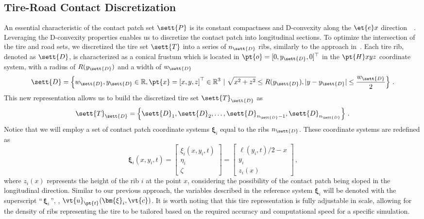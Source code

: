 \subsection{Tire-Road Contact Discretization}

An essential characteristic of the contact patch set $\sett{P}$ is its constant compactness and D-convexity along the $\et{e}x$ direction~~\cite{romano2022analytical, matouvsek2001directional}. Leveraging the D-convexity properties enables us to discretize the contact patch into longitudinal sections. To optimize the intersection of the tire and road sets, we discretized the tire set $\sett{T}$ into a series of $n_\sett{D}$ ribs, similarly to the approach in~\cite{chollet2012model, stocco2024novel}. Each tire rib, denoted as $\sett{D}$, is characterized as a conical frustum which is located in $\pt{o}= [0,y_\sett{D},0]^\top$ in the $\pt{H}xyz$ coordinate system, with a radius of $R(y_\sett{D})$ and a width of $w_\sett{D}$
%
\begin{equation}
  \sett{D} = \left\{ w_\sett{D}, y_\sett{D} \in \mathbb{R}, \pt{x} = \left[ x, y, z \right]^\top \in \mathbb{R}^3 ~|~ \sqrt{x^2+z^2} \leq R(y_\sett{D}), |y-y_\sett{D}| \leq \dfrac{w_\sett{D}}{2} \right\} \, \text{.}
\end{equation}
%
This new representation allows us to build the discretized tire set $\sett{T}_\sett{D}$ as
%
\begin{equation}
  \sett{T}_\sett{D} = \left\{ \sett{D}_1, \sett{D}_2, \dots, \sett{D}_{n_\sett{D}-1}, \sett{D}_{n_\sett{D}} \right\} \, \text{.}
\end{equation}
%
Notice that we will employ a set of contact patch coordinate systems $\bm{\xi}_i$ equal to the ribs $n_\sett{D}$. These coordinate systems are redefined as
%
\begin{equation}
  \bm{\xi}_i(x, y_i, t) =
  \begin{bmatrix}
    \xi_i(x, y_i, t) \\
    \eta_i \\
    \zeta
  \end{bmatrix}
  =
  \begin{bmatrix}
    \ell(y_i, t)/2 - x \\
    y_i \\
    z_i(x)
  \end{bmatrix} \, \text{,}
\end{equation}
%
where $z_i(x)$ represents the height of the rib $i$ at the point $x$, considering the possibility of the contact patch being sloped in the longitudinal direction. Similar to our previous approach, the variables described in the reference system $\bm{\xi}_i$ will be denoted with the superscript ``$\,\bm{\xi}_{i}\,$'', \eg{}, $\vt{u}_{\pt{t}}(\bm{\xi}_{i}, \vt{c})$. It is worth noting that this tire representation is fully adjustable in scale, allowing for the density of ribs representing the tire to be tailored based on the required accuracy and computational speed for a specific simulation.

